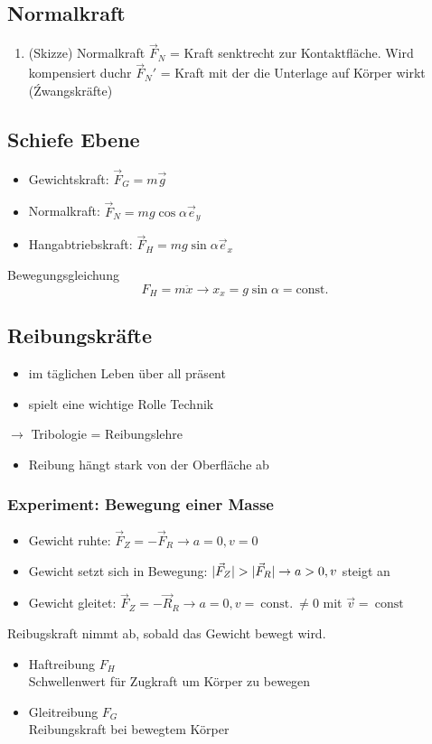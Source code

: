 \documentclass[a4paper]{scrartcl}
\DeclarePairedDelimiter\abs{\lvert}{\rvert}%
\renewcommand{\v}[1]{\vec{#1}}
\theoremstyle{definition}
\theoremstyle{plain}
\theoremstyle{plain}
\theoremstyle{remark}
\theoremstyle{remark}
\theoremstyle{remark}
\begin{document}
\subsection{Normalkraft}
\label{sec-3-5}
\begin{enumerate}
\item (Skizze) Normalkraft $\v{F}_N$ = Kraft senktrecht zur Kontaktfläche. Wird kompensiert duchr $\v{F}_N'$ = Kraft mit der die Unterlage auf Körper wirkt (Źwangskräfte)
\end{enumerate}
\subsection{Schiefe Ebene}
\label{sec-3-6}
\begin{itemize}
\item Gewichtskraft: $\v{F}_G = m\v g$
\item Normalkraft: $\v{F}_N = m g\cos{\alpha} \v{e}_y$
\item Hangabtriebskraft: $\v{F}_H = m g\sin{\alpha} \v{e}_x$
\end{itemize}
Bewegungsgleichung
\[F_H = m\ddot{x} \rightarrow x_x = g\sin{\alpha} =\text{const.}\]
\subsection{Reibungskräfte}
\label{sec-3-7}
\begin{itemize}
\item im täglichen Leben über all präsent
\item spielt eine wichtige Rolle Technik
\end{itemize}
$\rightarrow$ Tribologie = Reibungslehre
\begin{itemize}
\item Reibung hängt stark von der Oberfläche ab
\end{itemize}
\subsubsection{Experiment: Bewegung einer Masse}
\label{sec-3-7-1}
\begin{itemize}
\item Gewicht ruhte: $\v{F}_Z = - \v{F}_R \to a = 0, v = 0$
\item Gewicht setzt sich in Bewegung: $\abs{\v{F}_Z} > \abs{\v{F}_R} \to a > 0,v$ steigt an
\item Gewicht gleitet: $\v{F}_Z = - \v{R}_R \to a = 0, v =~\text{const.}~\neq 0$ mit $\v v =~\text{const}~$
\end{itemize}
Reibugskraft nimmt ab, sobald das Gewicht bewegt wird.
\begin{itemize}
\item Haftreibung $F_H$ \\
       Schwellenwert für Zugkraft um Körper zu bewegen
\item Gleitreibung $F_G$ \\
       Reibungskraft bei bewegtem Körper
\end{itemize}
\end{document}

